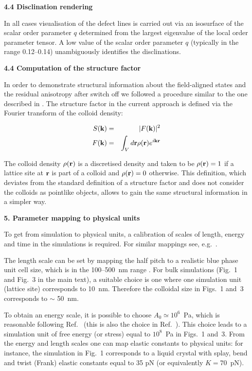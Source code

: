 \documentclass[12pt,twoside]{article}
\begin{document}
{\bf 4.4 Disclination rendering}

In all cases visualisation of the defect lines is carried out via
an isosurface of the scalar order parameter $q$ determined from the
largest eigenvalue of the local order parameter tensor. A low value
of the scalar order parameter $q$ (typically in the range 0.12--0.14)
unambiguously identifies the disclinations.

{\bf 4.4 Computation of the structure factor}

In order to demonstrate structural information about the field-aligned 
states and the residual anisotropy after switch off we followed a 
procedure similar to the one described in \cite{oliver-bp3}.
The structure factor in the current approach is defined via
the Fourier transform of the colloid density:

\begin{eqnarray}
S({\bf k})&=&|F({\bf k})|^2\\
F({\bf k})&=&\int_V d{\bf r} \rho({\bf r}) e^{i {\bf k r}}
\end{eqnarray}

The colloid density $\rho({\bf r})$ is a discretised density and taken to be
$\rho({\bf r})=1$ if a lattice site at ${\bf r}$ is part of a colloid
and $\rho({\bf r})=0$ otherwise. This definition, which deviates from the 
standard definition of a structure factor and does not consider the colloids 
as pointlike objects, allows to gain the same structural information
in a simpler way.

{\bf 5. Parameter mapping to physical units}

To get from simulation to physical units, a calibration of scales of
length, energy and time in the simulations is required. For similar
mappings see,
e.g.~\cite{denniston2}.

The length scale can be set by mapping the half pitch to a realistic blue
phase unit cell size, which is in the 100--500~nm range \cite{blue1}. 
For bulk simulations (Fig.~1 and Fig.~3 in the main text), a suitable choice
is one where one simulation unit (lattice site) corresponds to 10~nm. Therefore
the colloidal size in Figs.~1 and~3 corresponds to $\sim$ 50~nm. 

To obtain an energy scale, it is possible to choose $A_0 \simeq 10^6$~Pa,
which is reasonable following Ref.~\cite{blue1} (this is also the choice in
Ref.~\cite{oliver2}). This choice leads to a simulation unit of
free energy (or stress) equal to $10^{8}$~Pa in Figs.~1 and~3.
From the energy and length scales one can map elastic constants to
physical units: for instance, the simulation in Fig.~1 corresponds to
a liquid crystal with splay, bend and twist (Frank) elastic constants
equal to 35 pN (or equivalently $K=70$~pN).
\end{document}
